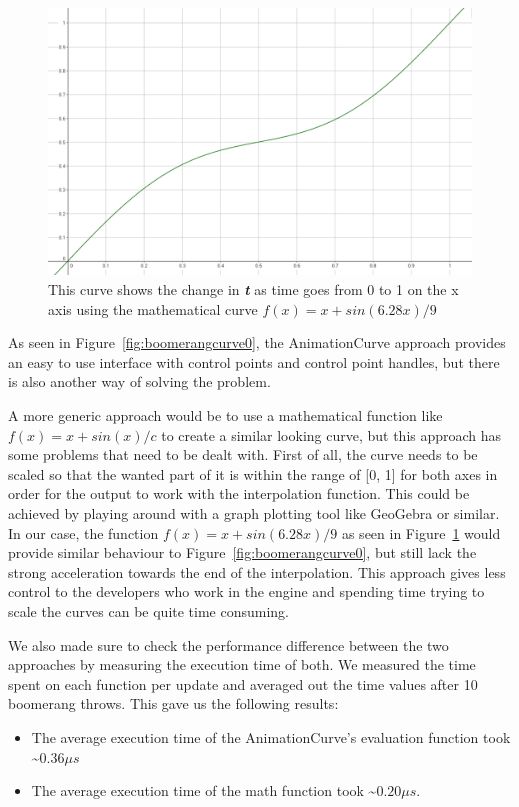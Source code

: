 \begin{figure}[tbph]
    \centering
    \includegraphics[width=.5\textwidth]{images/BoomerangMathematicalCurve}
    \caption[The mathematical curve representing the change in \textbf{\textit{t}}]{This curve shows the change in \textbf{\textit{t}} as time goes from 0 to 1 on the x axis using the mathematical curve $f(x) = x + sin(6.28x) / 9$}
    \label{fig:boomerangcurve1}
\end{figure}
    

As seen in Figure~\ref{fig:boomerangcurve0}, the AnimationCurve approach provides an easy to use interface with control points and control point handles, but there is also another way of solving the problem. 

A more generic approach would be to use a mathematical function like $f(x) = x + sin(x) / c$ to create a similar looking curve, but this approach has some problems that need to be dealt with. First of all, the curve needs to be scaled so that the wanted part of it is within the range of [0, 1] for both axes in order for the output to work with the interpolation function. This could be achieved by playing around with a graph plotting tool like GeoGebra or similar. In our case, the function $f(x) = x + sin(6.28x) / 9$ as seen in Figure~\ref{fig:boomerangcurve1} would provide similar behaviour to Figure~\ref{fig:boomerangcurve0}, but still lack the strong acceleration towards the end of the interpolation. This approach gives less control to the developers who work in the engine and spending time trying to scale the curves can be quite time consuming.

We also made sure to check the performance difference between the two approaches by measuring the execution time of both. We measured the time spent on each function per update and averaged out the time values after 10 boomerang throws. This gave us the following results:

\begin{itemize}
    \item The average execution time of the AnimationCurve's evaluation function took \textasciitilde$ 0.36 \mu s$
    \item The average execution time of the math function took \textasciitilde$ 0.20 \mu s$.
\end{itemize}

